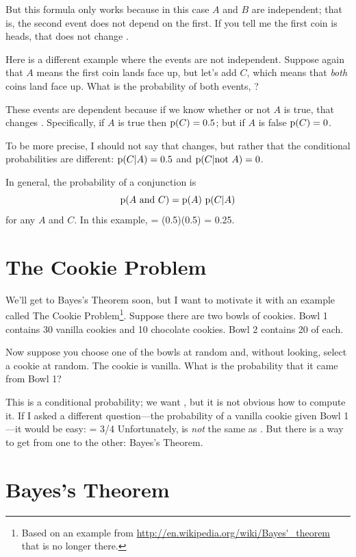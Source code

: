 \documentclass[12pt]{book}
\begin{document}
But this formula only works because in this case $A$ and $B$ are
independent; that is, the second event does not depend on the first.
If you tell me the first coin is heads, that does not change .

Here is a different example where the events are not independent.
Suppose again that $A$ means the first coin lands face up, but let's
add $C$, which means that {\em both} coins land face up.  What is the
probability of both events, ?

These events are dependent because if we know whether or not $A$ is
true, that changes .  Specifically, if $A$ is true then $\mathrm{p}(C)
= 0.5$; but if $A$ is false $\mathrm{p}(C) = 0$.

To be more precise, I should not say that  changes, but
rather that the conditional probabilities are different: $\mathrm{p}(C|A) = 0.5$
and $\mathrm{p}(C| \mathrm{not}~ A) = 0$.

In general, the probability of a conjunction is
%
\[ \mathrm{p}(A ~\mathrm{and}~ C) = \mathrm{p}(A)~\mathrm{p}(C|A) \]
%
for any $A$ and $C$.  In this example,  = (0.5)(0.5) = 0.25.


\section{The Cookie Problem}

We'll get to Bayes's Theorem soon, but I want to motivate it with an
example called The Cookie Problem\footnote{Based on an example from
  \url{http://en.wikipedia.org/wiki/Bayes'_theorem} that is no longer
  there.}.  Suppose there are two bowls of cookies.  Bowl 1 contains
  30 vanilla cookies and 10 chocolate cookies.  Bowl 2 contains 20 of
  each.

Now suppose you choose one of the bowls at random and, without
looking, select a cookie at random.  The cookie is vanilla.  What is
the probability that it came from Bowl 1?

This is a conditional probability; we want , but it is not obvious how to compute it.  If I asked a
different question---the probability of a vanilla cookie given Bowl
1---it would be easy:
%
 = 3/4
%
Unfortunately,  is {\em not} the same as .  But there
is a way to get from one to the other: Bayes's Theorem.


\section{Bayes's Theorem}
\end{document}

